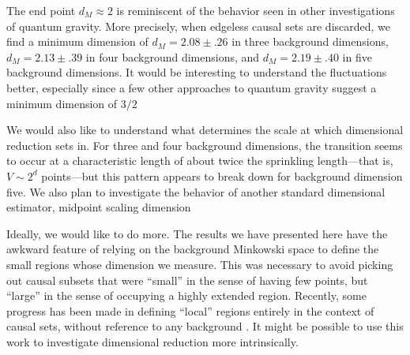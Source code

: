 \documentclass[12pt]{article}
\begin{document}
The end point $d_M\approx 2$ is reminiscent of the behavior seen in other
investigations of quantum gravity.  More precisely, when edgeless causal
sets are discarded, we find a minimum dimension of $d_M = 2.08 \pm .26$ in three
background dimensions, $d_M = 2.13 \pm .39$ in four background dimensions, and
$d_M = 2.19 \pm .40$ in five background  dimensions.  It would be interesting to
understand the fluctuations better, especially since a few other approaches to
quantum gravity suggest a minimum dimension of $3/2$

We would also like to understand what determines the scale at which dimensional
reduction sets in.  For three and four background dimensions, the transition seems to
occur at a characteristic length of about twice the sprinkling length---that is,
$V\sim 2^d$ points---but this pattern appears to break down for background
 dimension five.  We also plan to investigate the behavior of another standard
dimensional estimator, midpoint scaling dimension 

Ideally, we would like to do more.  The results we have presented here have the
awkward feature of relying on the background Minkowski space to define the
small regions whose dimension we measure.  This was necessary to avoid picking
out causal subsets that were ``small'' in the sense of having few points, but
``large'' in the sense of occupying a highly extended region.  Recently, some
progress has been made in defining ``local'' regions entirely in the context of
causal sets, without reference to any background .  It might be
possible to use this work to investigate dimensional reduction more intrinsically.
\end{document}
